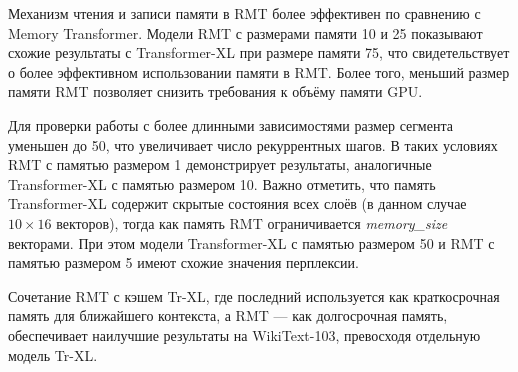 Механизм чтения и записи памяти в RMT более эффективен по сравнению с Memory Transformer. Модели RMT с размерами памяти 10 и 25 показывают схожие результаты с Transformer-XL при размере памяти 75, что свидетельствует о более эффективном использовании памяти в RMT. Более того, меньший размер памяти RMT позволяет снизить требования к объёму памяти GPU.

Для проверки работы с более длинными зависимостями размер сегмента уменьшен до 50, что увеличивает число рекуррентных шагов. В таких условиях RMT с памятью размером 1 демонстрирует результаты, аналогичные Transformer-XL с памятью размером 10. Важно отметить, что память Transformer-XL содержит скрытые состояния всех слоёв (в данном случае $10 \times 16$ векторов), тогда как память RMT ограничивается \textit{memory\_size} векторами. При этом модели Transformer-XL с памятью размером 50 и RMT с памятью размером 5 имеют схожие значения перплексии.%

Сочетание RMT с кэшем Tr-XL, где последний используется как краткосрочная память для ближайшего контекста, а RMT — как долгосрочная память, обеспечивает наилучшие результаты на WikiText-103, превосходя отдельную модель Tr-XL.

